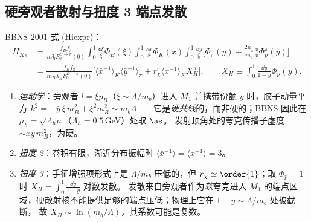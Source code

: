 \subsection{硬旁观者散射与扭度 3 端点发散}\label{sec:qcdf-endpoint}
BBNS 2001 式 (Hiexpr)：
\begin{equation}\label{eq:qcdf-H}
\begin{aligned}
H_{K\pi}&=\frac{f_Bf_\pi}{m_B^2F_0^{B\to\pi}(0)}\int_0^1\frac{\dd\xi}{\xi}\Phi_B(\xi)\int_0^1\frac{\dd x}{\bar x}\Phi_K(x)
\int_0^1\frac{\dd y}{\bar y}\Big[\Phi_\pi(y)+\frac{2\mu_\pi}{m_b}\frac{\bar x}{x}\Phi_p^\pi(y)\Big]\\
&=\frac{f_Bf_\pi}{m_B\lambda_BF_0^{B\to\pi}(0)}\Big[\langle\bar x^{-1}\rangle_K\langle\bar y^{-1}\rangle_\pi+r_\chi^\pi\langle x^{-1}\rangle_KX_H^\pi\Big],
\qquad X_H\equiv\int_0^1\frac{\dd y}{1-y}\Phi_p(y).
\end{aligned}
\end{equation}
\begin{enumerate}[label=(\roman*)]
\item \emph{运动学}：旁观者 $l=\xi p_B$（$\xi\sim\Lambda/m_b$）进入 $M_1$ 并携带份额 $\bar y$ 时，胶子动量平方
$k^2=-\bar y\,\xi\,m_B^2+\xi^2m_B^2\sim m_b\Lambda$——它是\emph{硬共线}的，而非硬的；BBNS 因此在 $\mu_h=\sqrt{\Lambda_h\mu}$（$\Lambda_h=0.5$\,GeV）处取 $\as$。
发射顶角处的夸克传播子虚度 $\sim x\bar y\,m_B^2$，为硬。
\item \emph{扭度 2}：卷积有限，渐近分布振幅时 $\langle\bar x^{-1}\rangle=\langle x^{-1}\rangle=3$。
\item \emph{扭度 3}：手征增强项形式上是 $\Lambda/m_b$ 压低的，但 $r_\chi\simeq\order{1}$；取 $\Phi_p=1$ 时 $X_H=\int_0^1\frac{\dd y}{1-y}$ 对数发散。
发散来自旁观者作为\emph{软}夸克进入 $M_1$ 的端点区域，硬散射核不能提供足够的端点压低；物理上它在 $1-y\sim\Lambda/m_b$ 处被截断，
故 $X_H\sim\ln(m_b/\Lambda)$，其系数可能是复数。
\end{enumerate}

